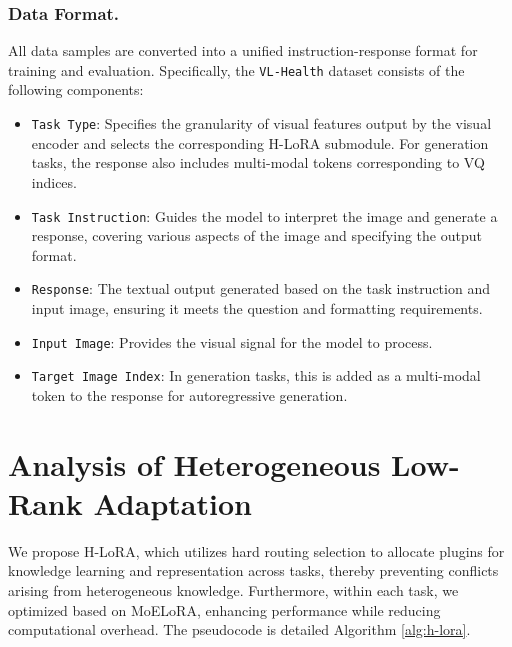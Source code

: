 
\subsubsection{Data Format.}

All data samples are converted into a unified instruction-response format for training and evaluation. Specifically, the \texttt{VL-Health} dataset consists of the following components:
\begin{itemize}
    \vspace{-2mm}
    \item \texttt{Task Type}: Specifies the granularity of visual features output by the visual encoder and selects the corresponding H-LoRA submodule. For generation tasks, the response also includes multi-modal tokens corresponding to VQ indices.
    \vspace{-2mm}
    \item \texttt{Task Instruction}: Guides the model to interpret the image and generate a response, covering various aspects of the image and specifying the output format.
    \vspace{-2mm}
    \item \texttt{Response}: The textual output generated based on the task instruction and input image, ensuring it meets the question and formatting requirements.
    \vspace{-2mm}
    \item \texttt{Input Image}: Provides the visual signal for the model to process.
    \vspace{-2mm}
    \item \texttt{Target Image Index}: In generation tasks, this is added as a multi-modal token to the response for autoregressive generation.
    \vspace{-2mm}
\end{itemize}

\section{Analysis of Heterogeneous Low-Rank Adaptation}
We propose H-LoRA, which utilizes hard routing selection to allocate plugins for knowledge learning and representation across tasks, thereby preventing conflicts arising from heterogeneous knowledge. Furthermore, within each task, we optimized based on MoELoRA, enhancing performance while reducing computational overhead. The pseudocode is detailed Algorithm \ref{alg:h-lora}.

